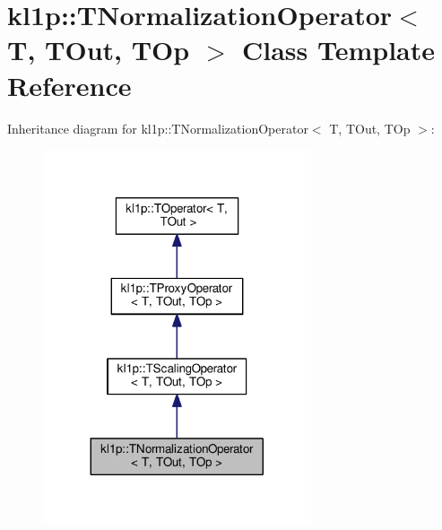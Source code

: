 \hypertarget{classkl1p_1_1TNormalizationOperator}{}\section{kl1p\+:\+:T\+Normalization\+Operator$<$ T, T\+Out, T\+Op $>$ Class Template Reference}
\label{classkl1p_1_1TNormalizationOperator}


Inheritance diagram for kl1p\+:\+:T\+Normalization\+Operator$<$ T, T\+Out, T\+Op $>$\+:
\nopagebreak
\begin{figure}[H]
\begin{center}
\leavevmode
\includegraphics[width=224pt]{classkl1p_1_1TNormalizationOperator__inherit__graph}
\end{center}
\end{figure}


